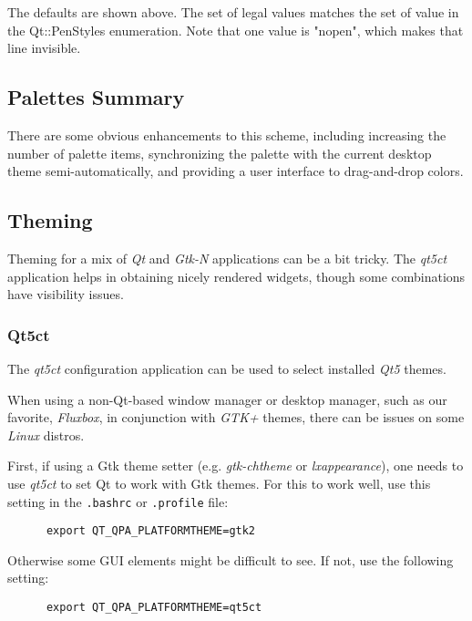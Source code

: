    The defaults are shown above.
   The set of legal values matches the set
   of value in the Qt::PenStyles enumeration.
   Note that one value is "nopen", which makes that line invisible.

\subsection{Palettes Summary}
\label{subsec:palettes_summary}

   There are some obvious enhancements to this scheme, including increasing the
   number of palette items, synchronizing the palette with the current desktop
   theme semi-automatically, and providing a user interface to drag-and-drop
   colors.

\subsection{Theming}
\label{subsec:palettes_theming}

   Theming for a mix of \textsl{Qt} and \textsl{Gtk-N} applications can be a
   bit tricky.
   The \textsl{qt5ct} application helps in obtaining nicely rendered
   widgets, though some combinations have visibility issues.

\subsubsection{Qt5ct}
\label{subsubsec:palettes_theming_qt5ct}

   The \textsl{qt5ct} configuration application can be used to select installed
   \textsl{Qt5} themes.

   When using a non-Qt-based window manager or desktop manager, such as our
   favorite, \textsl{Fluxbox}, in conjunction with \textsl{GTK+} themes,
   there can be issues on some \textsl{Linux} distros.

   First, if using a Gtk theme setter (e.g. \textsl{gtk-chtheme}
   or \textsl{lxappearance}),
   one needs to
   use \textsl{qt5ct} to set Qt to work with Gtk themes.
   For this to work well, use this setting in the \texttt{.bashrc} or
   \texttt{.profile} file:

   \begin{verbatim}
      export QT_QPA_PLATFORMTHEME=gtk2
   \end{verbatim}

   Otherwise some GUI elements might be difficult to see.
   If not, use the following setting:

   \begin{verbatim}
      export QT_QPA_PLATFORMTHEME=qt5ct
   \end{verbatim}

